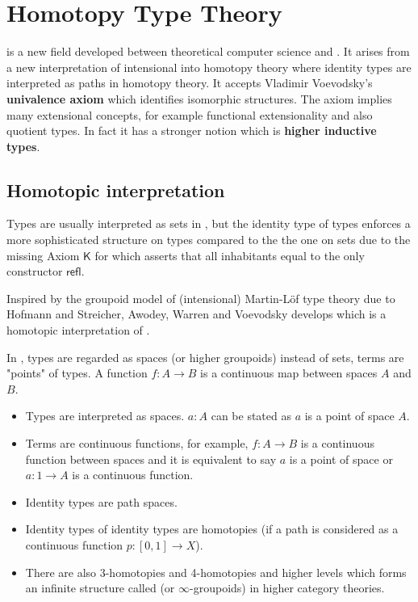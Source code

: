 

\section{Homotopy Type Theory}

\hott is a new field developed between theoretical computer science
and \maths.
It arises from a new interpretation of intensional \mltt
into homotopy theory where identity types are interpreted as paths in homotopy theory.
It accepts Vladimir Voevodsky's \textbf{univalence axiom} which identifies isomorphic
structures. The axiom implies many extensional concepts, for example functional extensionality and also quotient types. In fact it has a stronger notion which is \textbf{higher inductive types}.


\subsection{Homotopic interpretation}

Types are usually interpreted as sets in \mltt, but the identity type of types enforces a more sophisticated structure on types compared to the the one on sets due to the missing Axiom $\mathsf{K}$ for which asserts that all inhabitants equal to the only constructor $\mathsf{refl}$. 

Inspired by the groupoid model of (intensional) Martin-Löf type theory due to Hofmann and Streicher, Awodey, Warren \cite{awodey-warren} and Voevodsky \cite{VV} develops \hott which is a homotopic interpretation of \mltt.

In \hott, types are regarded as spaces (or higher groupoids) instead of sets, terms are "points" of types. A function $f : A \to B$ is a continuous map between spaces $A$ and $B$.

\begin{itemize}
\item Types are interpreted as spaces. $a : A$ can be stated as $a$ is
  a point of space $A$.
\item Terms are continuous functions, for example, $f : A \rightarrow B$ is a
  continuous function between spaces and it is equivalent to say $a$ is
  a point of space or $a : 1 \rightarrow A$ is a continuous function.
\item Identity types are path spaces.
\item Identity types of identity types are homotopies (if a path is considered as a continuous function $p : [0,1] \rightarrow X$).
\item There are also 3-homotopies and 4-homotopies and higher
  levels which forms an infinite structure called \og (or $\infty$-groupoids) in higher category theories.
\end{itemize}

